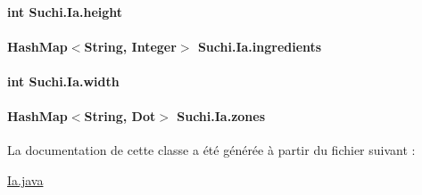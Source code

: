 \paragraph[{height}]{\setlength{\rightskip}{0pt plus 5cm}int Suchi.\+Ia.\+height\hspace{0.3cm}{\ttfamily [package]}}\label{classSuchi_1_1Ia_af7ce6cad6d21a47c9c31559657a9f000}
\hypertarget{classSuchi_1_1Ia_a40844cdcf9d0c53a5c49971378c8b03e}{}
\paragraph[{ingredients}]{\setlength{\rightskip}{0pt plus 5cm}Hash\+Map$<$String, Integer$>$ Suchi.\+Ia.\+ingredients\hspace{0.3cm}{\ttfamily [private]}}\label{classSuchi_1_1Ia_a40844cdcf9d0c53a5c49971378c8b03e}
\hypertarget{classSuchi_1_1Ia_a12da02ac75078cffa5ab4f3562a6ee98}{}
\paragraph[{width}]{\setlength{\rightskip}{0pt plus 5cm}int Suchi.\+Ia.\+width\hspace{0.3cm}{\ttfamily [private]}}\label{classSuchi_1_1Ia_a12da02ac75078cffa5ab4f3562a6ee98}
\hypertarget{classSuchi_1_1Ia_ae7edf7225509076e80f8cddd700bc528}{}
\paragraph[{zones}]{\setlength{\rightskip}{0pt plus 5cm}Hash\+Map$<$String, {\bf Dot}$>$ Suchi.\+Ia.\+zones\hspace{0.3cm}{\ttfamily [private]}}\label{classSuchi_1_1Ia_ae7edf7225509076e80f8cddd700bc528}


La documentation de cette classe a été générée à partir du fichier suivant \+:\begin{DoxyCompactItemize}
\item 
\hyperlink{Ia_8java}{Ia.\+java}\end{DoxyCompactItemize}
